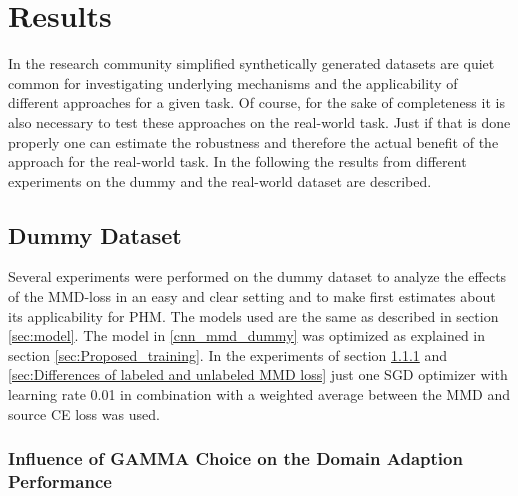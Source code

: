 \chapter{Results}\label{chapter:results}
In the research community simplified synthetically generated datasets are quiet common for investigating underlying mechanisms and the applicability of different approaches for a given task. Of course, for the sake of completeness it is also necessary to test these approaches on the real-world task. Just if that is done properly one can estimate the robustness and therefore the actual benefit of the approach for the real-world task. In the following the results from different experiments on the dummy and the real-world dataset are described.

\section{Dummy Dataset}\label{sec:results_dummy_dataset}
Several experiments were performed on the dummy dataset to analyze the effects of the MMD-loss in an easy and clear setting and to make first estimates about its applicability for PHM. The models used are the same as described in section \ref{sec:model}. The model in \ref{cnn_mmd_dummy} was optimized as explained in section \ref{sec:Proposed_training}. In the experiments of section \ref{sec:Balancing Cross-Entropy and MMD loss} and \ref{sec:Differences of labeled and unlabeled MMD loss} just one SGD optimizer with learning rate 0.01 in combination with a weighted average between the MMD and source CE loss was used.

\subsection{Influence of GAMMA Choice on the Domain Adaption Performance} \label{sec:Balancing Cross-Entropy and MMD loss}

